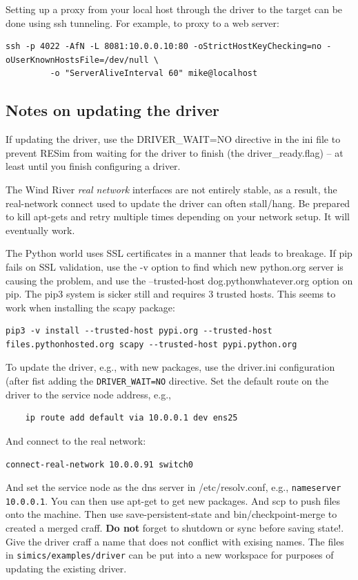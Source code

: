 \documentclass[titlepage]{article}
\begin{document}
\begin{appendices}
Setting up a proxy from your local host through the driver to the target can be done using ssh tunneling.  For example, to proxy to a web server:
\begin{verbatim}
ssh -p 4022 -AfN -L 8081:10.0.0.10:80 -oStrictHostKeyChecking=no -oUserKnownHostsFile=/dev/null \
         -o "ServerAliveInterval 60" mike@localhost
\end{verbatim}

\subsection{Notes on updating the driver}
If updating the driver, use the DRIVER\_WAIT=NO directive in the ini file to prevent RESim from waiting for the driver to finish 
(the driver\_ready.flag) -- at least until you finish configuring a driver.

The Wind River \textit{real network} interfaces are not entirely stable, as a result, the real-network connect used to update the driver can often stall/hang.
Be prepared to kill apt-gets and retry multiple times depending on your network setup.  It will eventually work.

The Python world uses SSL certificates in a manner that leads to breakage.  If pip fails on SSL validation, use the -v option
to find which new python.org server is causing the problem, and use the --trusted-host dog.pythonwhatever.org option on pip.
The pip3 system is sicker still and requires 3 trusted hosts.  This seems to work when installing the scapy package:
\begin{verbatim}
pip3 -v install --trusted-host pypi.org --trusted-host files.pythonhosted.org scapy --trusted-host pypi.python.org
\end{verbatim}

To update the driver, e.g., with new packages, use the driver.ini configuration (after fist adding the {\tt DRIVER\_WAIT=NO} directive.  
Set the default route on the driver to the service node address, e.g.,
\begin{verbatim}
    ip route add default via 10.0.0.1 dev ens25
\end{verbatim}
And connect to the real network:
\begin{verbatim}
connect-real-network 10.0.0.91 switch0
\end{verbatim}
And set the service node as the dns server in /etc/resolv.conf, e.g.,  {\tt nameserver 10.0.0.1}.
You can then use apt-get to get new packages.  And scp to push files onto the machine.  Then use save-persistent-state and bin/checkpoint-merge to
created a merged craff.  \textbf{Do not} forget to shutdown or sync before saving state!.  Give the driver craff a name that does not conflict with exising names.
The files in {\tt simics/examples/driver} can be put into a new workspace for purposes of updating the existing driver.


\end{appendices}
\end{document}
